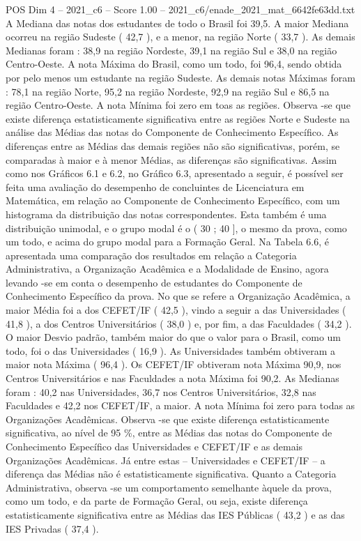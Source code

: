 \begin{textsample}{POS Dim 4 – 2021\_c6 – Score 1.00 – 2021\_c6/enade\_2021\_mat\_6642fe63dd.txt}
A Mediana das notas dos estudantes de todo o Brasil foi 39,5.
A maior Mediana ocorreu na região Sudeste ( 42,7 ), e a menor, na região Norte ( 33,7 ).
As demais Medianas foram : 38,9 na região Nordeste, 39,1 na região Sul e 38,0 na região Centro-Oeste.
A nota Máxima do Brasil, como um todo, foi 96,4, sendo obtida por pelo menos um estudante na região Sudeste.
As demais notas Máximas foram : 78,1 na região Norte, 95,2 na região Nordeste, 92,9 na região Sul e 86,5 na região Centro-Oeste.
A nota Mínima foi zero em toas as regiões.
Observa -se que existe diferença estatisticamente significativa entre as regiões Norte e Sudeste na análise das Médias das notas do Componente de Conhecimento Específico.
As diferenças entre as Médias das demais regiões não são significativas, porém, se comparadas à maior e à menor Médias, as diferenças são significativas.
Assim como nos Gráficos 6.1 e 6.2, no Gráfico 6.3, apresentado a seguir, é possível ser feita uma avaliação do desempenho de concluintes de Licenciatura em Matemática, em relação ao Componente de Conhecimento Específico, com um histograma da distribuição das notas correspondentes.
Esta também é uma distribuição unimodal, e o grupo modal é o ( 30 ; 40 ], o mesmo da prova, como um todo, e acima do grupo modal para a Formação Geral.
Na Tabela 6.6, é apresentada uma comparação dos resultados em relação a Categoria Administrativa, a Organização Acadêmica e a Modalidade de Ensino, agora levando -se em conta o desempenho de estudantes do Componente de Conhecimento Específico da prova.
No que se refere a Organização Acadêmica, a maior Média foi a dos CEFET/IF ( 42,5 ), vindo a seguir a das Universidades ( 41,8 ), a dos Centros Universitários ( 38,0 ) e, por fim, a das Faculdades ( 34,2 ).
O maior Desvio padrão, também maior do que o valor para o Brasil, como um todo, foi o das Universidades ( 16,9 ).
As Universidades também obtiveram a maior nota Máxima ( 96,4 ).
Os CEFET/IF obtiveram nota Máxima 90,9, nos Centros Universitários e nas Faculdades a nota Máxima foi 90,2.
As Medianas foram : 40,2 nas Universidades, 36,7 nos Centros Universitários, 32,8 nas Faculdades e 42,2 nos CEFET/IF, a maior.
A nota Mínima foi zero para todas as Organizações Acadêmicas.
Observa -se que existe diferença estatisticamente significativa, ao nível de 95 \%, entre as Médias das notas do Componente de Conhecimento Específico das Universidades e CEFET/IF e as demais Organizações Acadêmicas.
Já entre estas – Universidades e CEFET/IF – a diferença das Médias não é estatisticamente significativa.
Quanto a Categoria Administrativa, observa -se um comportamento semelhante àquele da prova, como um todo, e da parte de Formação Geral, ou seja, existe diferença estatisticamente significativa entre as Médias das IES Públicas ( 43,2 ) e as das IES Privadas ( 37,4 ).

\end{textsample}
